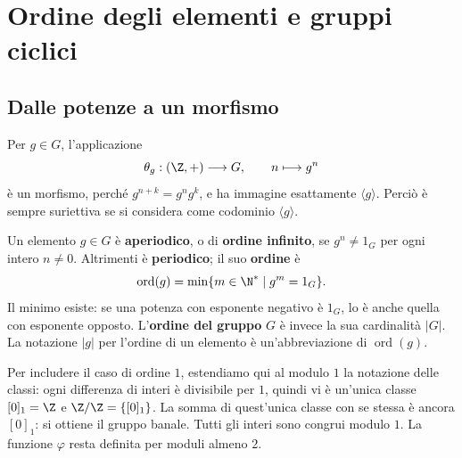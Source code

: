 \section{Ordine degli elementi e gruppi ciclici}
\subsection{Dalle potenze a un morfismo}
Per $g\in G$, l'applicazione
\[
\theta_g:(\Z,+)\longrightarrow G,\qquad n\longmapsto g^n
\]
è un morfismo, perché $g^{n+k}=g^ng^k$, e ha immagine esattamente $\langle g\rangle$. Perciò è sempre suriettiva se si considera come codominio $\langle g\rangle$.

\begin{definizione}
Un elemento $g\in G$ è \textbf{aperiodico}, o di \textbf{ordine infinito}, se $g^n\ne1_G$ per ogni intero $n\ne0$. Altrimenti è \textbf{periodico}; il suo \textbf{ordine} è
\[
\operatorname{ord}(g)=\min\{m\in\N^*\mid g^m=1_G\}.
\]
Il minimo esiste: se una potenza con esponente negativo è $1_G$, lo è anche quella con esponente opposto. L'\textbf{ordine del gruppo} $G$ è invece la sua cardinalità $|G|$. La notazione $|g|$ per l'ordine di un elemento è un'abbreviazione di $\operatorname{ord}(g)$.
\end{definizione}

\begin{osservazione}
Per includere il caso di ordine $1$, estendiamo qui al modulo $1$ la notazione delle classi: ogni differenza di interi è divisibile per $1$, quindi vi è un'unica classe $[0]_1=\Z$ e $\Z/\Z=\{[0]_1\}$. La somma di quest'unica classe con se stessa è ancora $[0]_1$: si ottiene il gruppo banale. Tutti gli interi sono congrui modulo $1$. La funzione $\varphi$ resta definita per moduli almeno $2$.
\end{osservazione}

